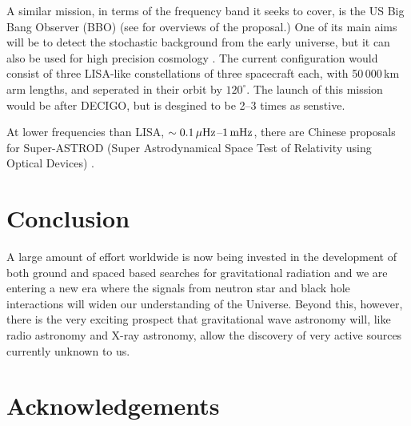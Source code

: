 \documentclass{article}
\begin{document}
A similar mission, in terms of the frequency band it seeks to cover, is the US
Big Bang Observer (BBO) (see \cite{Crowder:2005, Cutler:2009, Harry:2006} for
overviews of the proposal.) One of its main aims will be to detect the
stochastic background from the early universe, but it can also be used for high
precision cosmology \cite{Cutler:2009}. The current configuration would consist
of three LISA-like constellations of three spacecraft each, with 50\,000\,km arm
lengths, and seperated in their orbit by $120^{\circ}$. The launch of this
mission would be after DECIGO, but is desgined to be 2--3 times as senstive.

At lower frequencies than LISA, $\sim0.1\,\mu{\rm Hz}$--$1\,{\rm mHz}$, there
are Chinese proposals for Super-ASTROD (Super Astrodynamical Space Test of
Relativity using Optical Devices) \cite{Ni:2009}.


\newpage

\section{Conclusion}
\label{section:conclusion}

A large amount of effort worldwide is now being invested in the development of
both ground and spaced based searches for gravitational radiation and we are
entering a new era where the signals from neutron star and black hole
interactions will widen our understanding of the Universe. Beyond this, however,
there is the very exciting prospect that gravitational wave astronomy will, like
radio astronomy and X-ray astronomy, allow the discovery of very active sources
currently unknown to us.




\newpage

\section{Acknowledgements}
\label{section:acknowledgements}
\end{document}
